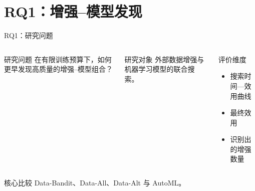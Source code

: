 \documentclass[10pt,aspectratio=169]{beamer}
\begin{document}

\section{RQ1：增强--模型发现}

\begin{frame}{RQ1：研究问题}
  \begin{columns}[T,onlytextwidth]
    \begin{block}{研究问题}
      在有限训练预算下，如何更早发现高质量的增强--模型组合？
    \end{block}
    \begin{block}{研究对象}
      外部数据增强与机器学习模型的联合搜索。
    \end{block}
    \begin{block}{评价维度}
      \begin{itemize}
        \item 搜索时间—效用曲线
        \item 最终效用
        \item 识别出的增强数量
      \end{itemize}
    \end{block}
  \end{columns}
  \begin{alertblock}{核心比较}
    Data-Bandit、Data-All、Data-Alt 与 AutoML。
  \end{alertblock}
\end{frame}
\end{document}
